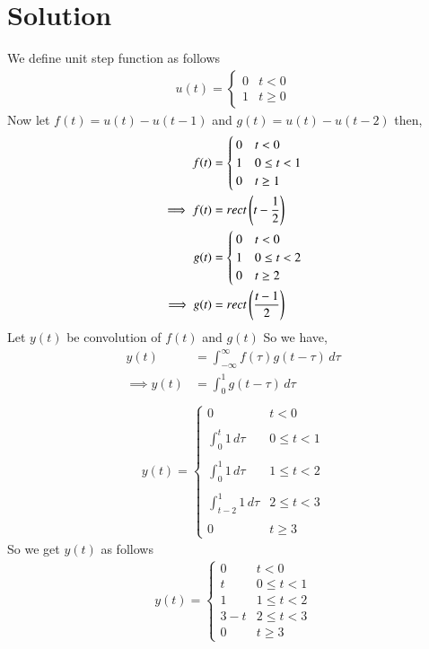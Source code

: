 \documentclass[journal,12pt,twocolumn]{IEEEtran}
\begin{document}
\section{Solution}
We define unit step function as follows 
\begin{align}
    u(t) =  \begin{cases} 
        0 & t < 0 \\
        1 & t\geq 0
   \end{cases}
\end{align}
Now let $f(t)=u(t)-u(t-1)$ and $g(t)=u(t)-u(t-2)$ then,
\begin{align}
    f(t) &=  \begin{cases} 
        0 & t < 0 \\
        1 & 0\leq t<1\\
        0 & t\geq 1
   \end{cases}\\
   \implies f(t) &= rect\left(t-\frac{1}{2}\right)\\
   g(t) &=  \begin{cases} 
        0 & t < 0 \\
        1 & 0\leq t<2\\
        0 & t\geq 2
   \end{cases}\\
   \implies g(t) &= rect\left(\frac{t-1}{2}\right)
\end{align}
Let $y(t)$ be convolution of $f(t)$ and $g(t)$ So we have,
\begin{align}
    y(t) &= \int_{-\infty}^{\infty}f(\tau)g(t-\tau)\,d\tau\\
    \implies y(t) &= \int_{0}^{1}g(t-\tau)\,d\tau\\
\end{align}
\begin{align}
    y(t) =  \begin{cases} 
        0 & t < 0 \\ \\
        \int_0^t 1\,d\tau & 0\leq t<1\\ \\
        \int_0^1 1\,d\tau & 1\leq t<2\\ \\
        \int_{t-2}^1 1\,d\tau & 2\leq t<3\\ \\
        0 & t\geq 3
   \end{cases}
\end{align}
So we get $y(t)$ as follows
\begin{align}
    y(t) =  \begin{cases} 
        0 & t < 0 \\ 
        t & 0\leq t<1\\ 
        1 & 1\leq t<2\\
        3-t & 2\leq t<3\\
        0 & t\geq 3
   \end{cases}
\end{align}
\end{document}
